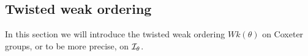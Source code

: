 \subsection{Twisted weak ordering}
\label{sec:twisted-involutions-twisted-weak-ordering}

In this section we will introduce the twisted weak ordering $Wk(\theta)$ on Coxeter groups, or to be more precise, on $\mathcal{I}_{\theta}$. 

\todo